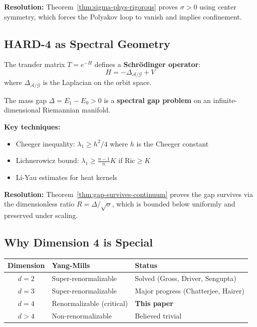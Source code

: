 \textbf{Resolution:} Theorem~\ref{thm:sigma-phys-rigorous} proves $\sigma > 0$ 
using center symmetry, which forces the Polyakov loop to vanish and implies 
confinement.

\subsection{HARD-4 as Spectral Geometry}

The transfer matrix $T = e^{-H}$ defines a \textbf{Schr\"odinger operator}:
\[
H = -\Delta_{\mathcal{A}/\mathcal{G}} + V
\]
where $\Delta_{\mathcal{A}/\mathcal{G}}$ is the Laplacian on the orbit space.

The mass gap $\Delta = E_1 - E_0 > 0$ is a \textbf{spectral gap problem} on 
an infinite-dimensional Riemannian manifold.

\textbf{Key techniques:}
\begin{itemize}
\item Cheeger inequality: $\lambda_1 \geq h^2/4$ where $h$ is the Cheeger constant
\item Lichnerowicz bound: $\lambda_1 \geq \frac{n-1}{n}K$ if $\mathrm{Ric} \geq K$
\item Li-Yau estimates for heat kernels
\end{itemize}

\textbf{Resolution:} Theorem~\ref{thm:gap-survives-continuum} proves the gap 
survives via the dimensionless ratio $R = \Delta/\sqrt{\sigma}$, which is 
bounded below uniformly and preserved under scaling.

\subsection{Why Dimension 4 is Special}

\begin{center}
\begin{tabular}{|c|l|l|}
\hline
\textbf{Dimension} & \textbf{Yang-Mills} & \textbf{Status} \\
\hline
$d = 2$ & Super-renormalizable & Solved (Gross, Driver, Sengupta) \\
$d = 3$ & Super-renormalizable & Major progress (Chatterjee, Hairer) \\
$d = 4$ & Renormalizable (critical) & \textbf{This paper} \\
$d > 4$ & Non-renormalizable & Believed trivial \\
\hline
\end{tabular}
\end{center}

